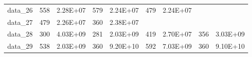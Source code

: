 \begin{table}[]
\begin{tabular}{lllllllll}
data\_26 & 558                                    & 2.28E+07                                   & 579                                      & 2.24E+07                                     & 479                                          & 2.24E+07                                        &                 &                    \\
data\_27 & 479                                    & 2.26E+07                                   & 360                                      & 2.38E+07                                     &                                              &                                                 &                 &                    \\
data\_28 & 300                                    & 4.03E+09                                   & 281                                      & 2.03E+09                                     & 419                                          & 2.70E+07                                        & 356             & 3.03E+09           \\
data\_29 & 538                                    & 2.03E+09                                   & 360                                      & 9.20E+10                                     & 592                                          & 7.03E+09                                        & 360             & 9.10E+10           \\ \hline
\end{tabular}
\end{table}